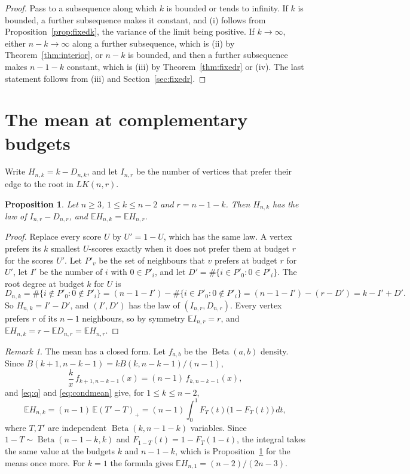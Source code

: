\documentclass[11pt]{amsart}
\newtheorem{proposition}[theorem]{Proposition}
\theoremstyle{remark}
\newtheorem{remark}[theorem]{Remark}
\numberwithin{equation}{section}
\newcommand{\E}{\mathbb E}
\newcommand{\1}{\mathbf 1}
\newcommand{\Bet}{\operatorname{Beta}}
\begin{document}
\begin{proof}
Pass to a subsequence along which $k$ is bounded or tends to infinity. If $k$ is bounded, a further subsequence makes it constant, and (i) follows from Proposition~\ref{prop:fixedk}, the variance of the limit being positive. If $k\to\infty$, either $n-k\to\infty$ along a further subsequence, which is (ii) by Theorem~\ref{thm:interior}, or $n-k$ is bounded, and then a further subsequence makes $n-1-k$ constant, which is (iii) by Theorem~\ref{thm:fixedr} or (iv). The last statement follows from (iii) and Section~\ref{sec:fixedr}.
\end{proof}

\section{The mean at complementary budgets}\label{sec:dual}

Write $H_{n,k}=k-D_{n,k}$, and let $I_{n,r}$ be the number of vertices that prefer their edge to the root in $LK(n,r)$.

\begin{proposition}\label{prop:dual}
Let $n\ge3$, $1\le k\le n-2$ and $r=n-1-k$. Then $H_{n,k}$ has the law of $I_{n,r}-D_{n,r}$, and $\E H_{n,k}=\E H_{n,r}$.
\end{proposition}

\begin{proof}
Replace every score $U$ by $U'=1-U$, which has the same law. A vertex prefers its $k$ smallest $U$-scores exactly when it does not prefer them at budget $r$ for the scores $U'$. Let $P'_v$ be the set of neighbours that $v$ prefers at budget $r$ for $U'$, let $I'$ be the number of $i$ with $0\in P'_i$, and let $D'=\#\{i\in P'_0:0\in P'_i\}$. The root degree at budget $k$ for $U$ is
\[
D_{n,k}=\#\{i\notin P'_0:0\notin P'_i\}=(n-1-I')-\#\{i\in P'_0:0\notin P'_i\}=(n-1-I')-(r-D')=k-I'+D'.
\]
So $H_{n,k}=I'-D'$, and $(I',D')$ has the law of $(I_{n,r},D_{n,r})$. Every vertex prefers $r$ of its $n-1$ neighbours, so by symmetry $\E I_{n,r}=r$, and $\E H_{n,k}=r-\E D_{n,r}=\E H_{n,r}$.
\end{proof}

\begin{remark}\label{rem:gini}
The mean has a closed form. Let $f_{a,b}$ be the $\Bet(a,b)$ density. Since $B(k+1,n-k-1)=kB(k,n-k-1)/(n-1)$,
\[
\frac kx\,f_{k+1,n-k-1}(x)=(n-1)\,f_{k,n-k-1}(x),
\]
and \eqref{eq:q} and \eqref{eq:condmean} give, for $1\le k\le n-2$,
\[
\E H_{n,k}=(n-1)\,\E(T'-T)_+=(n-1)\int_0^1F_T(t)\bigl(1-F_T(t)\bigr)\,dt,
\]
where $T,T'$ are independent $\Bet(k,n-1-k)$ variables. Since $1-T\sim\Bet(n-1-k,k)$ and $F_{1-T}(t)=1-F_T(1-t)$, the integral takes the same value at the budgets $k$ and $n-1-k$, which is Proposition~\ref{prop:dual} for the means once more. For $k=1$ the formula gives $\E H_{n,1}=(n-2)/(2n-3)$.
\end{remark}
\end{document}
